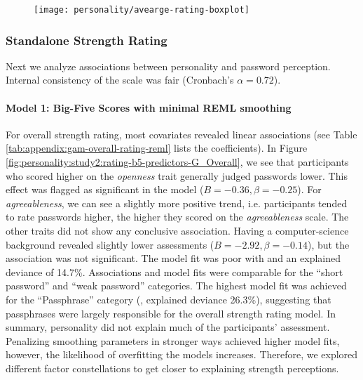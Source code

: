 \begin{figure}[htbp]
	\centering
	\texttt{[image: personality/avearge-rating-boxplot]}
	\caption{\label{fig:personality:study2:average-rating-boxplot}}
\end{figure}

%

\subsubsection{Standalone Strength Rating}
Next we analyze associations between personality and password perception. Internal consistency of the scale was fair (Cronbach's $\alpha=0.72$). 

\paragraph{Model 1: Big-Five Scores with minimal REML smoothing}
For overall strength rating, most covariates revealed linear associations (see Table \ref{tab:appendix:gam-overall-rating-reml} lists the coefficients). In Figure \ref{fig:personality:study2:rating-b5-predictors-G_Overall}, we see that participants who scored higher on the \textit{openness} trait generally judged passwords lower. This effect was flagged as significant in the model ($B=-0.36, \beta=-0.25$). For \textit{agreeableness}, we can see a slightly more positive trend, i.e. participants tended to rate passwords higher, the higher they scored on the \textit{agreeableness} scale. The other traits did not show any conclusive association. Having a computer-science background revealed slightly lower assessments ($B=-2.92, \beta=-0.14$), but the association was not significant. The model fit was poor with  and an explained deviance of 14.7\%. Associations and model fits were comparable for the ``short password'' and ``weak password'' categories. The highest model fit was achieved for the ``Passphrase'' category (, explained deviance 26.3\%), suggesting that passphrases were largely responsible for the overall strength rating model. In summary, personality did not explain much of the participants' assessment. Penalizing smoothing parameters in stronger ways achieved higher model fits, however, the likelihood of overfitting the models increases. Therefore, we explored different factor constellations to get closer to explaining strength perceptions.

